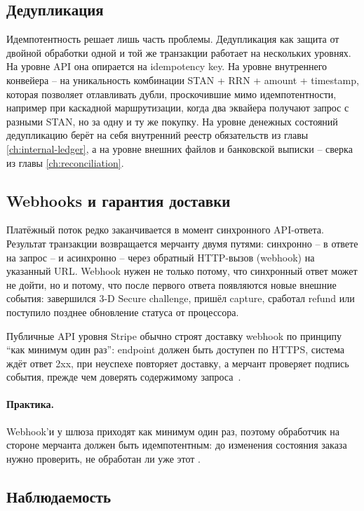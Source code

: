 \subsection*{Дедупликация}

Идемпотентность решает лишь часть проблемы. Дедупликация
как защита от двойной обработки одной и той же транзакции
работает на нескольких уровнях. На уровне API она опирается
на idempotency key. На уровне внутреннего конвейера -- на
уникальность комбинации STAN + RRN + amount + timestamp,
которая позволяет отлавливать дубли, проскочившие мимо
идемпотентности, например при каскадной маршрутизации, когда
два эквайера получают запрос с разными STAN, но за одну и ту
же покупку. На уровне денежных состояний дедупликацию берёт
на себя внутренний реестр обязательств из главы
\ref{ch:internal-ledger}, а на уровне внешних файлов и банковской
выписки -- сверка из главы \ref{ch:reconciliation}.

\subsection*{Webhooks и гарантия доставки}

Платёжный поток редко заканчивается в момент синхронного
API-ответа. Результат транзакции возвращается мерчанту
двумя путями: синхронно -- в ответе на запрос -- и асинхронно
-- через обратный HTTP-вызов (webhook) на указанный URL.
Webhook нужен не только потому, что синхронный ответ может
не дойти, но и потому, что после первого ответа появляются
новые внешние события: завершился 3-D Secure challenge,
пришёл capture, сработал refund или поступило позднее
обновление статуса от процессора.

Публичные API уровня Stripe обычно строят доставку webhook
по принципу \enquote{как минимум один раз}: endpoint должен
быть доступен по HTTPS, система ждёт ответ 2xx, при неуспехе
повторяет доставку, а мерчант проверяет подпись события,
прежде чем доверять содержимому запроса~\cite{stripe-webhooks}.

\paragraph{Практика.}
Webhook'и у шлюза приходят как минимум один раз, поэтому обработчик на стороне мерчанта должен быть идемпотентным: до изменения состояния заказа нужно проверить, не обработан ли уже этот .


\subsection*{Наблюдаемость}

